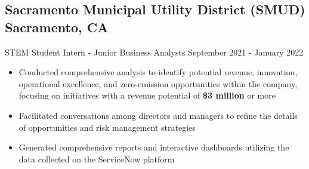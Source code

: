 \documentclass[a4,10pt]{article}
\newcommand{\subtext}[1]{
#1\par\vspace{-0.2cm}}
\newenvironment{zitemize}{
\begin{itemize}\itemsep0pt \parskip0pt \parsep1pt}
{\end{itemize}\vspace{-0.5cm}}
\begin{document}
\subsection*{Sacramento Municipal Utility District (SMUD) \hfill Sacramento, CA} 
\subtext{STEM Student Intern - Junior Business Analysts \hfill September 2021 - January 2022} 
    \begin{zitemize}
        \item Conducted comprehensive analysis to identify potential revenue, innovation, operational excellence, and zero-emission opportunities within the company, focusing on initiatives with a revenue potential of \textbf{\$3 million} or more
        \item Facilitated conversations among directors and managers to refine the details of opportunities and risk management strategies
        \item Generated comprehensive reports and interactive dashboards utilizing the data collected on the ServiceNow platform
        
    
    \end{zitemize}

\end{document}
